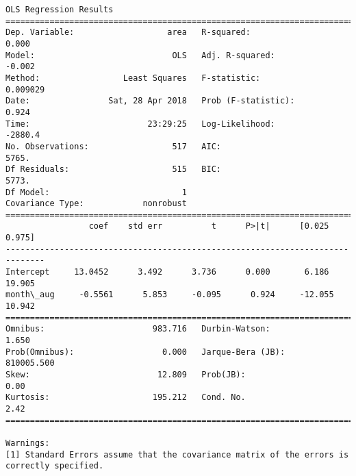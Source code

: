 \documentclass[11pt]{article}
\begin{document}
\begin{Verbatim}[commandchars=\\\{\}]
                            OLS Regression Results                            
==============================================================================
Dep. Variable:                   area   R-squared:                       0.000
Model:                            OLS   Adj. R-squared:                 -0.002
Method:                 Least Squares   F-statistic:                  0.009029
Date:                Sat, 28 Apr 2018   Prob (F-statistic):              0.924
Time:                        23:29:25   Log-Likelihood:                -2880.4
No. Observations:                 517   AIC:                             5765.
Df Residuals:                     515   BIC:                             5773.
Df Model:                           1                                         
Covariance Type:            nonrobust                                         
==============================================================================
                 coef    std err          t      P>|t|      [0.025      0.975]
------------------------------------------------------------------------------
Intercept     13.0452      3.492      3.736      0.000       6.186      19.905
month\_aug     -0.5561      5.853     -0.095      0.924     -12.055      10.942
==============================================================================
Omnibus:                      983.716   Durbin-Watson:                   1.650
Prob(Omnibus):                  0.000   Jarque-Bera (JB):           810005.500
Skew:                          12.809   Prob(JB):                         0.00
Kurtosis:                     195.212   Cond. No.                         2.42
==============================================================================

Warnings:
[1] Standard Errors assume that the covariance matrix of the errors is correctly specified.



\end{Verbatim}
\end{document}
